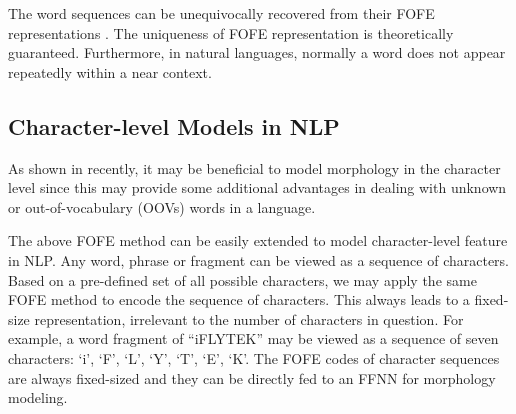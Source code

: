 \documentclass[11pt,a4paper]{article}
\newtheorem{theorem}{Theorem}
\begin{document}
The word sequences can be unequivocally recovered from their FOFE representations \cite{zhang2015fixed}.
The uniqueness of FOFE representation is theoretically guaranteed.
Furthermore, in natural languages, normally a word does not appear repeatedly within a near context. 


\subsection {Character-level Models in NLP}
\label{subsec_char_feature}

As shown in \cite{kim2015character} recently, it may be beneficial to model morphology in the character level since this may provide some additional advantages in dealing with unknown or out-of-vocabulary (OOVs) words in a language.

The above FOFE method can be easily extended to model character-level feature in NLP. Any word, phrase or fragment can be viewed as a sequence of characters. Based on a pre-defined set of all possible characters, we may apply the same FOFE method to encode the sequence of characters. This always leads to a fixed-size representation, irrelevant to the number of characters in question. 
For example, a word fragment of ``iFLYTEK'' may be viewed as a 
sequence of seven characters: `i', `F', `L', `Y', `T', `E', `K'.
The FOFE codes of character sequences are always fixed-sized and they can be directly fed to an FFNN for  morphology  modeling. 
\end{document}
